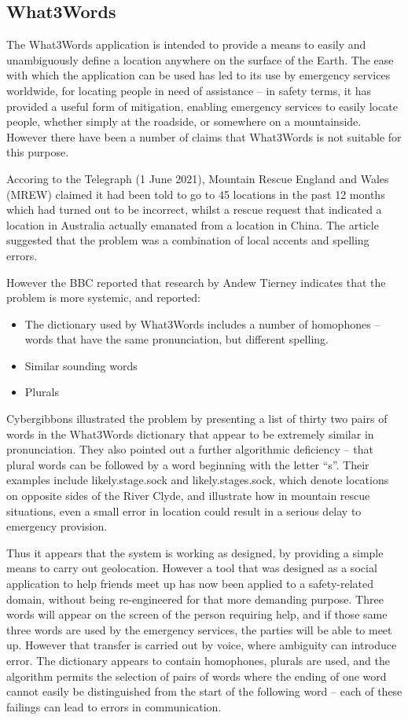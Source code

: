 \subsection{What3Words}\label{bkm:incacc:w3w}
The What3Words application is intended to provide a means to easily and unambiguously define a location anywhere on the surface of
the Earth. The ease with which the application can be used has led to its use by emergency services worldwide, for locating people in need of assistance -- in safety terms, it has provided a useful form of \gls{mitigation}, enabling emergency services to easily locate people,
whether simply at the roadside, or somewhere on a mountainside.
However there have been a number of claims that What3Words is not suitable for this purpose.

Accoring to the Telegraph (1 June 2021),
Mountain Rescue England and Wales (MREW) claimed it had been told to go to 45 locations in the past 12 months which had turned out
to be incorrect, whilst a rescue request that indicated a location in Australia actually emanated from a location in China.
The article suggested that the problem was a combination of local accents and spelling errors.

However the BBC reported that research by Andew Tierney indicates that the problem is more systemic, and reported:
\begin{itemize}
\item The dictionary used by What3Words includes a number of homophones -- words that have the same pronunciation, but different spelling.
\item Similar sounding words
\item Plurals
\end{itemize}
Cybergibbons illustrated the problem by presenting a list of thirty two pairs of words in the What3Words dictionary that appear to
be extremely similar in pronunciation. They also pointed out a further algorithmic deficiency -- that plural words can be followed
by a word beginning with the letter ``s''. Their examples include likely.stage.sock and likely.stages.sock, which denote locations on opposite sides of the River Clyde, and illustrate how in mountain rescue situations, even a small error in location could result in
a serious delay to emergency provision.

Thus it appears that the system is working as designed, by providing a simple means to carry out geolocation.
However a tool that was designed as a social application to help friends meet up has now been applied to a safety-related domain,
without being re-engineered for that more demanding purpose.
Three words will appear on the screen of the person requiring help, and if those same three words are used by the emergency services,
the parties will be able to meet up.
However that transfer is carried out by voice, where ambiguity can introduce error.
The dictionary appears to contain homophones, plurals are used, and the algorithm permits the selection of pairs of words where the
ending of one word cannot easily be distinguished from the start of the following word -- each of these failings can lead to
errors in communication. 

